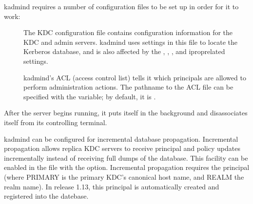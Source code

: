 \documentclass[letterpaper,10pt,english]{sphinxmanual}
\begin{document}
\sphinxAtStartPar
kadmind requires a number of configuration files to be set up in order
for it to work:
\begin{description}
\item[{{\hyperref[\detokenize{admin/conf_files/kdc_conf:kdc-conf-5}]{}}}] \leavevmode
\sphinxAtStartPar
The KDC configuration file contains configuration information for
the KDC and admin servers.  kadmind uses settings in this file to
locate the Kerberos database, and is also affected by the
, , , and iprop\sphinxhyphen{}related
settings.

\item[{{\hyperref[\detokenize{admin/conf_files/kadm5_acl:kadm5-acl-5}]{}}}] \leavevmode
\sphinxAtStartPar
kadmind’s ACL (access control list) tells it which principals are
allowed to perform administration actions.  The pathname to the
ACL file can be specified with the  {\hyperref[\detokenize{admin/conf_files/kdc_conf:kdc-conf-5}]{}}
variable; by default, it is {\hyperref[\detokenize{mitK5defaults:paths}]{}}.

\end{description}

\sphinxAtStartPar
After the server begins running, it puts itself in the background and
disassociates itself from its controlling terminal.

\sphinxAtStartPar
kadmind can be configured for incremental database propagation.
Incremental propagation allows replica KDC servers to receive
principal and policy updates incrementally instead of receiving full
dumps of the database.  This facility can be enabled in the
{\hyperref[\detokenize{admin/conf_files/kdc_conf:kdc-conf-5}]{}} file with the  option.  Incremental
propagation requires the principal  (where
PRIMARY is the primary KDC’s canonical host name, and REALM the realm
name).  In release 1.13, this principal is automatically created and
registered into the datebase.
\end{document}
